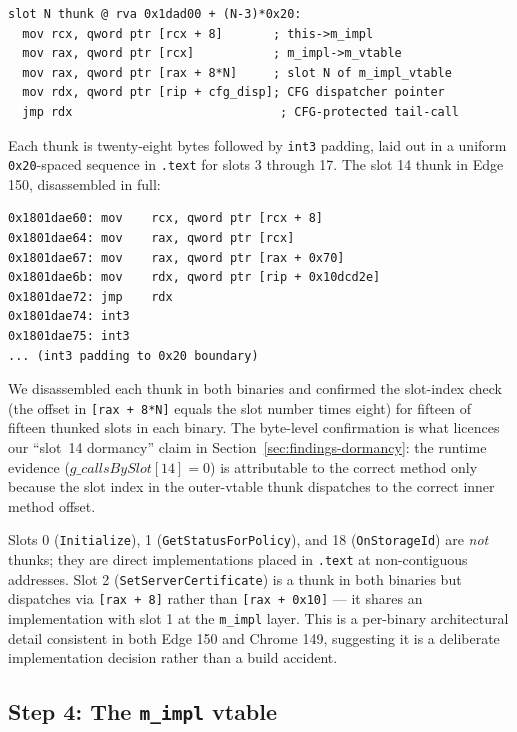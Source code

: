 \documentclass[11pt,letterpaper]{article}
\begin{document}
\begin{lstlisting}[basicstyle=\ttfamily\scriptsize]
slot N thunk @ rva 0x1dad00 + (N-3)*0x20:
  mov rcx, qword ptr [rcx + 8]       ; this->m_impl
  mov rax, qword ptr [rcx]           ; m_impl->m_vtable
  mov rax, qword ptr [rax + 8*N]     ; slot N of m_impl_vtable
  mov rdx, qword ptr [rip + cfg_disp]; CFG dispatcher pointer
  jmp rdx                             ; CFG-protected tail-call
\end{lstlisting}

Each thunk is twenty-eight bytes followed by \texttt{int3} padding,
laid out in a uniform \texttt{0x20}-spaced sequence in \texttt{.text}
for slots 3 through 17. The slot 14 thunk in Edge 150, disassembled
in full:

\begin{lstlisting}[basicstyle=\ttfamily\scriptsize]
0x1801dae60: mov    rcx, qword ptr [rcx + 8]
0x1801dae64: mov    rax, qword ptr [rcx]
0x1801dae67: mov    rax, qword ptr [rax + 0x70]
0x1801dae6b: mov    rdx, qword ptr [rip + 0x10dcd2e]
0x1801dae72: jmp    rdx
0x1801dae74: int3
0x1801dae75: int3
... (int3 padding to 0x20 boundary)
\end{lstlisting}

We disassembled each thunk in both binaries and confirmed the
slot-index check (the offset in \texttt{[rax + 8*N]} equals the slot
number times eight) for fifteen of fifteen thunked slots in each
binary. The byte-level confirmation is what licences our
``slot~14 dormancy'' claim in Section~\ref{sec:findings-dormancy}:
the runtime evidence
($g\_callsBySlot[14] = 0$) is attributable to the
correct method only because the slot index in the outer-vtable
thunk dispatches to the correct inner method offset.

Slots 0 (\texttt{Initialize}), 1 (\texttt{GetStatusForPolicy}), and
18 (\texttt{OnStorageId}) are \emph{not} thunks; they are direct
implementations placed in \texttt{.text} at non-contiguous
addresses. Slot 2 (\texttt{SetServerCertificate}) is a thunk in both
binaries but dispatches via \texttt{[rax + 8]} rather than
\texttt{[rax + 0x10]} --- it shares an implementation with slot 1 at
the \texttt{m\_impl} layer. This is a per-binary architectural
detail consistent in both Edge 150 and Chrome 149, suggesting it
is a deliberate implementation decision rather than a build
accident.

\subsection{Step 4: The \texttt{m\_impl} vtable}
\label{sec:static-mimpl}
\end{document}
